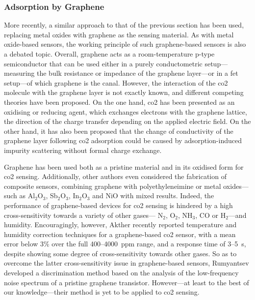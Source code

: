 \subsubsection{Adsorption by Graphene}\label{subsect:choos:review:graphene}

More recently, a similar approach to that of the previous section has been used, replacing metal oxides with graphene as the sensing material\cite{amin2014, singh2017}. As with metal oxide-based sensors, the working principle of such graphene-based sensors is also a debated topic. Overall, graphene acts as a room-temperature p-type semiconductor that can be used either in a purely conductometric setup---measuring the bulk resistance or impedance of the graphene layer\cite{yoon2011, zhou2014, akhter2021}---or in a \gls{fet} setup---of which graphene is the canal\cite{lu2009}. However, the interaction of the \gls{co2} molecule with the graphene layer is not exactly known, and different competing theories have been proposed. On the one hand, \gls{co2} has been presented as an oxidising or reducing agent, which exchanges electrons with the graphene lattice, the direction of the charge transfer depending on the applied electric field\cite{muruganathan2015}. On the other hand, it has also been proposed that the change of conductivity of the graphene layer following \gls{co2} adsorption could be caused by adsorption-induced impurity scattering without formal charge exchange\cite{sun2016}.

Graphene has been used both as a pristine material\cite{yoon2011, chen2012, smith2017, fan2018} and in its oxidised form\cite{zaki2019, akhter2021} for \gls{co2} sensing. Additionally, other authors even considered the fabrication of composite sensors, combining graphene with polyethyleneimine\cite{zhou2014} or metal oxides---such as Al$_2$O$_3$\cite{nemade2014b}, Sb$_2$O$_3$\cite{nemade2014a}, In$_2$O$_3$ and NiO\cite{amarnath2021} with mixed results. Indeed, the performance of graphene-based devices for \gls{co2} sensing is hindered by a high cross-sensitivity towards a variety of other gases---\eg{} N$_2$, O$_2$, NH$_3$, CO or H$_2$\cite{chen2012, smith2017, akhter2021}---and humidity\cite{smith2017, fan2018, shaban2019}. Encouragingly, however, Akther \etal{}\cite{akhter2021} recently reported temperature and humidity correction techniques for a graphene-based \gls{co2} sensor, with a mean error below 3\% over the full 400--4000~ppm range, and a response time of 3--5~s, despite showing some degree of cross-sensitivity towards other gases. So as to overcome the latter cross-sensitivity issue in graphene-based sensors, Rumyantsev \etal{}\cite{rumyantsev2012} developed a discrimination method based on the analysis of the low-frequency noise spectrum of a pristine graphene transistor. However---at least to the best of our knowledge---their method is yet to be applied to \gls{co2} sensing.

